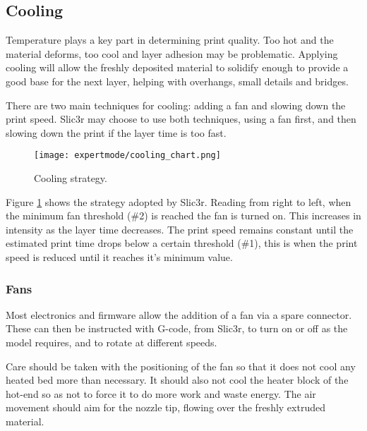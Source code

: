 
\subsection{Cooling} %
\label{sec:cooling}

Temperature plays a key part in determining print quality.  Too hot and the material deforms, too cool and layer adhesion may be problematic.  Applying cooling will allow the freshly deposited material to solidify enough to provide a good base for the next layer, helping with overhangs, small details and bridges.

There are two main techniques for cooling: adding a fan and slowing down the print speed.  Slic3r may choose to use both techniques, using a fan first, and then slowing down the print if the layer time is too fast.  

\begin{figure}[H]
\centering
\texttt{[image: expertmode/cooling\_chart.png]}
\caption{Cooling strategy.}
\label{fig:cooling_chart}
\end{figure}

Figure \ref{fig:cooling_chart} shows the strategy adopted by Slic3r.  Reading from right to left, when the minimum fan threshold (\#2) is reached the fan is turned on.  This increases in intensity as the layer time decreases.  The print speed remains constant until the estimated print time drops below a certain threshold (\#1), this is when the print speed is reduced until it reaches it's minimum value.

\subsubsection{Fans} %
\label{sub:fans}
Most electronics and firmware allow the addition of a fan via a spare connector.  These can then be instructed with G-code, from Slic3r, to turn on or off as the model requires, and to rotate at different speeds.

Care should be taken with the positioning of the fan so that it does not cool any heated bed more than necessary.  It should also not cool the heater block of the hot-end so as not to force it to do more work and waste energy.  The air movement should aim for the nozzle tip, flowing over the freshly extruded material. 

\begin{comment}
\begin{figure}[H]
\centering
\texttt{[image: placeholder.jpg]}
\caption{Ideal fan placement.}
\label{fig:ideal_fan_placement}
\end{figure}
\end{comment}


